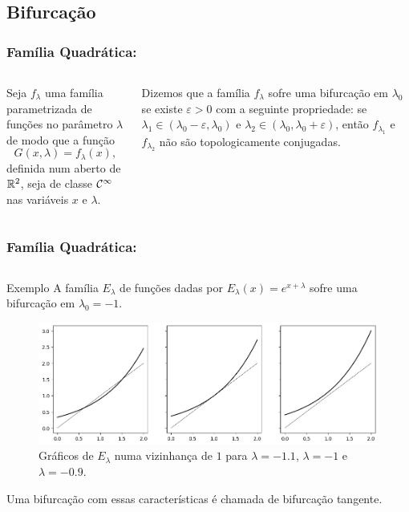 \subsection{Bifurcação}


\begin{frame}
\vspace{5pt}
\frametitle{Família Quadrática: \subsecname}
\begin{columns}
\column{\dimexpr\paperwidth-15pt}

Seja $f_\lambda$ uma família parametrizada de funções no parâmetro $\lambda$ de modo que a função
$$G(x, \lambda) = f_\lambda(x),$$
definida num aberto de $\mathbb{R}^2$, seja de classe $\mathcal{C}^\infty$ nas variáveis $x$ e $\lambda$.

\begin{definition}
Dizemos que a família $f_\lambda$ sofre uma bifurcação em $\lambda_0$ se existe $\varepsilon > 0$ com a seguinte propriedade: se $\lambda_1 \in (\lambda_0 - \varepsilon, \lambda_0)$ e $\lambda_2 \in (\lambda_0, \lambda_0 + \varepsilon)$, então $f_{\lambda_1}$ e $f_{\lambda_2}$ não são topologicamente conjugadas.
\end{definition}

\end{columns}
\end{frame}


\begin{frame}
\vspace{5pt}
\frametitle{Família Quadrática: \subsecname}
\begin{columns}
\column{\dimexpr\paperwidth-15pt}

\begin{block}{Exemplo}
A família $E_\lambda$ de funções dadas por $E_\lambda(x) = e^{x + \lambda}$ sofre uma bifurcação em $\lambda_0 = -1$.

\begin{figure}[!htb]
\centering
\includegraphics[scale=0.4]{images/e_lambda.png}
\caption{Gráficos de $E_\lambda$ numa vizinhança de $1$ para $\lambda = -1.1$, $\lambda = -1$ e $\lambda = -0.9$.}
\label{e_lambda}
\end{figure}

Uma bifurcação com essas características é chamada de bifurcação tangente.
\end{block}

\end{columns}
\end{frame}

